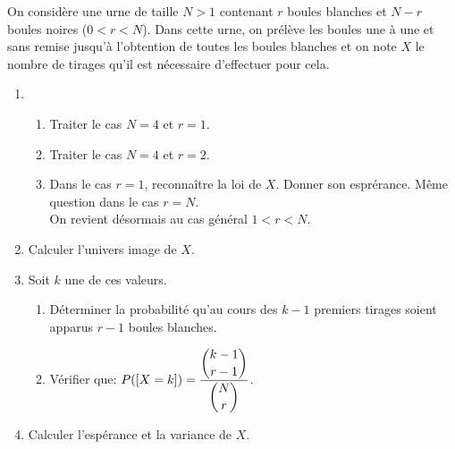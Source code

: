 \documentclass[a4paper, 11pt,reqno]{article}
\begin{document}
\begin{exercice}
	On consid\`ere une urne de taille $N>1$ contenant $r$ boules blanches et $N-r$ boules noires ($0<r<N$). Dans cette urne, on pr\'el\`eve les boules une \`a une et sans remise jusqu'\`a l'obtention de toutes les boules blanches et on note $X$ le nombre de tirages qu'il est n\'ecessaire d'effectuer pour cela.
	\begin{enumerate}
		\item
		      \begin{enumerate}
			      \item Traiter le cas $N=4$ et $r=1$.
			      \item Traiter le cas $N=4$ et $r=2$.
			      \item Dans le cas $r=1$, reconna\^itre la loi de $X$. Donner son espr\'erance. M\^eme question dans le cas $r=N$.\\
			            \noindent On revient d\'esormais au cas g\'en\'eral $1<r<N$.
		      \end{enumerate}
		\item Calculer l'univers image de $X$.
		\item Soit $k$ une de ces valeurs.
		      \begin{enumerate}
			      \item D\'eterminer la probabilit\'e qu'au cours des $k-1$ premiers tirages soient apparus $r-1$ boules blanches.
			      \item V\'erifier que: $P(\lbrack X=k\rbrack)=\displaystyle\frac{\displaystyle \binom{k-1}{r-1}}{\displaystyle \binom{N}{r}}$.
		      \end{enumerate}
		\item Calculer l'esp\'erance et la variance de $X$.
	\end{enumerate}
\end{exercice}
\end{document}
